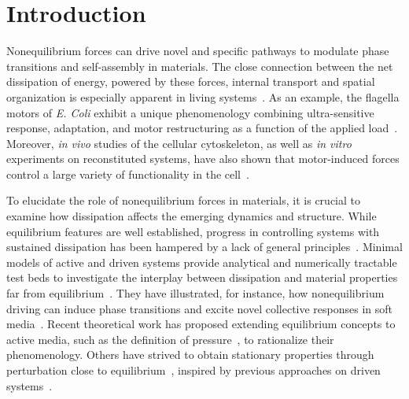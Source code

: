 \documentclass[pre, superscriptaddress, twocolumn,pre]{revtex4-1}
\begin{document}


\section{Introduction}

Nonequilibrium forces can drive novel and specific pathways to modulate phase transitions and self-assembly in materials. The close connection between the net dissipation of energy, powered by these forces, internal transport and spatial organization is especially apparent in living systems~\cite{Toyabe2010, Ahmed2016, Battle604, Mura2018}. As an example, the flagella motors of {\it E. Coli} exhibit a unique phenomenology combining ultra-sensitive response, adaptation, and motor restructuring as a function of the applied load~\cite{Lele2013, Lan2012, Wang2017}. Moreover, {\it in vivo} studies of the cellular cytoskeleton, as well as {\it in vitro} experiments on reconstituted systems, have also shown that motor-induced forces control a large variety of functionality in the cell~\cite{Silva2011, Sanchez2012, Blanchoin2014, Murrell2015, Decamp2015}.


To elucidate the role of nonequilibrium forces in materials, it is crucial to examine how dissipation affects the emerging dynamics and structure. While equilibrium features are well established, progress in controlling systems with sustained dissipation has been hampered by a lack of general principles~\cite{Cates2015, Solon2015a, Nguyen2016, Fodor2016, Murugan2017, Nardini2017, Nguyen2018}. Minimal models of active and driven systems provide analytical and numerically tractable test beds to investigate the interplay between dissipation and material properties far from equilibrium~\cite{Marchetti2013, Han2016, Bechinger2016, delJunco2018, Marchetti2018}. They have illustrated, for instance, how nonequilibrium driving can induce phase transitions and excite novel collective responses in soft media~\cite{Vicsek1995, Tailleur2008, Han2016, Nguyen2016, VanZuiden2016}. Recent theoretical work has proposed extending equilibrium concepts to active media, such as the definition of pressure~\cite{Takatori2015, Solon2015a, Solon2015b}, to rationalize their phenomenology. Others have strived to obtain stationary properties through perturbation close to equilibrium~\cite{Nardini2017}, inspired by previous approaches on driven systems~\cite{McLennan1959, Komatsu2008, Maes2009, Maes2010}.
\end{document}
